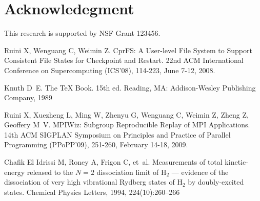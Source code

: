\documentclass{ics}
\begin{document}
\section*{Acknowledegment}
\label{sec:acknowledegment}
This research is supported by NSF Grant 123456.

% 
% 
% 

\begin{thebibliography}{99}
 Ruini X, Wenguang C, Weimin Z. CprFS: A User-level File System
  to Support Consistent File States for Checkpoint and Restart. 22nd ACM
  International Conference on Supercomputing (ICS'08), 114-223, June 7-12, 2008.

 Knuth D~E. The {\TeX} Book. 15th ed. Reading, MA: Addison-Wesley
  Publishing Company, 1989

 Ruini X, Xuezheng L, Ming W, Zhenyu G, Wenguang C, Weimin Z,
  Zheng Z, Geoffery M~V. MPIWiz: Subgroup Reproducible Replay of MPI
  Applications. 14th ACM SIGPLAN Symposium on Principles and Practice of
  Parallel Programming (PPoPP'09), 251-260, February 14-18, 2009.

 {Chafik El Idrissi} M, Roney A, Frigon C, et~al. Measurements
  of total kinetic-energy released to the {$N=2$} dissociation limit of {H}$_2$
  --- evidence of the dissociation of very high vibrational {R}ydberg states of
  {H}$_2$ by doubly-excited states. Chemical Physics Letters, 1994,
  224(10):260--266


\end{thebibliography}
\end{document}
